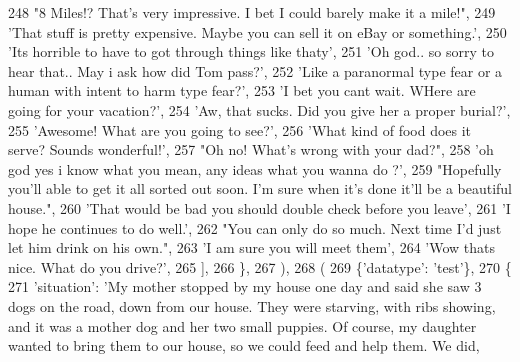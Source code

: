 \begin{DoxyCode}
248                             \textcolor{stringliteral}{"8 Miles!? That's very impressive.  I bet I could barely make it a mile!"},
249                             \textcolor{stringliteral}{'That stuff is pretty expensive. Maybe you can sell it on eBay or something.'},
250                             \textcolor{stringliteral}{'Its horrible to have to got through things like thaty'},
251                             \textcolor{stringliteral}{'Oh god.. so sorry to hear that.. May i ask how did Tom pass?'},
252                             \textcolor{stringliteral}{'Like a paranormal type fear or a human with intent to harm type fear?'},
253                             \textcolor{stringliteral}{'I bet you cant wait.  WHere are going for your vacation?'},
254                             \textcolor{stringliteral}{'Aw, that sucks. Did you give her a proper burial?'},
255                             \textcolor{stringliteral}{'Awesome! What are you going to see?'},
256                             \textcolor{stringliteral}{'What kind of food does it serve? Sounds wonderful!'},
257                             \textcolor{stringliteral}{"Oh no! What's wrong with your dad?"},
258                             \textcolor{stringliteral}{'oh god yes i know what you mean, any ideas what you wanna do ?'},
259                             \textcolor{stringliteral}{"Hopefully you'll able to get it all sorted out soon.  I'm sure when it's done
       it'll be a beautiful house."},
260                             \textcolor{stringliteral}{'That would be bad you should double check before you leave'},
261                             \textcolor{stringliteral}{'I hope he continues to do well.'},
262                             \textcolor{stringliteral}{"You can only do so much.  Next time I'd just let him drink on his own."},
263                             \textcolor{stringliteral}{'I am sure you will meet them'},
264                             \textcolor{stringliteral}{'Wow thats nice.  What do you drive?'},
265                         ],
266                     \},
267                 ),
268                 (
269                     \{\textcolor{stringliteral}{'datatype'}: \textcolor{stringliteral}{'test'}\},
270                     \{
271                         \textcolor{stringliteral}{'situation'}: \textcolor{stringliteral}{'My mother stopped by my house one day and said she saw 3 dogs on the
       road, down from our house. They were starving, with ribs showing, and it was a mother dog and her two small
       puppies. Of course, my daughter wanted to bring them to our house, so we could feed and help them. We did,
}
\end{DoxyCode}
